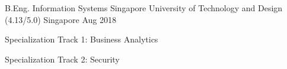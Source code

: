 

\begin{cventries}

  \cventry
    {B.Eng. Information Systems} %
    {Singapore University of Technology and Design (4.13/5.0)} %
    {Singapore} %
    {Aug 2018} %
    {
      \begin{cvitems} %
        \item {Specialization Track 1: Business Analytics}
        \item {Specialization Track 2: Security}
      \end{cvitems}
    }

\end{cventries}
